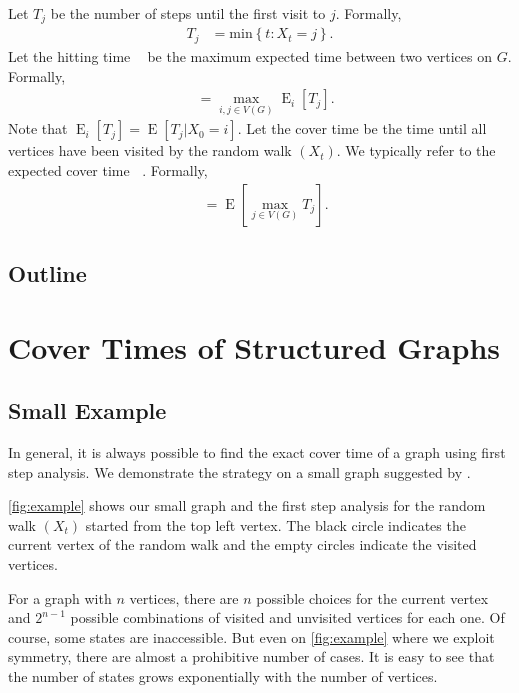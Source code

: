 \documentclass[12pt]{article}
\theoremstyle{definition}
\DeclareMathOperator{\E}{\mathrm{E}}		%
\DeclareMathOperator{\cov}{t_\textrm{cov}}  %
\DeclareMathOperator{\hit}{t_{\textrm{hit}}}%
\begin{document}
Let $T_{j}$ be the number of steps until the first visit to $j$.
Formally,
\begin{align}
T_{j} &= \textrm{min} \left\{t : X_t = j \right\}. \nonumber
\end{align}
Let the hitting time $\hit$ be the maximum expected time between two vertices on $G$.
Formally, 
\begin{align}
\hit &= \max_{i,j \in V(G)} \E_i[T_j]. \nonumber
\end{align}
Note that $\E_i[T_j] = \E[T_j | X_0 = i]$.
Let the cover time be the time until all vertices have been
visited by the random walk $(X_t)$.
We typically refer to the expected cover time $\cov$.
Formally,
\begin{align}
\cov &= \E [ \max_{j \in V(G)} T_j ]. \nonumber
\end{align}

\subsection{Outline}


\section{Cover Times of Structured Graphs}

\subsection{Small Example}
In general, it is always possible to find the exact cover time
of a graph using first step analysis.
We demonstrate the strategy on a small graph suggested by \cite{BH94}.

\cref{fig:example} shows our small graph and the first step analysis
for the random walk $(X_t)$ started from the top left vertex.
The black circle indicates the current vertex of the random walk
and the empty circles indicate the visited vertices.

For a graph with $n$ vertices, there are $n$ possible choices for the current
vertex and $2^{n-1}$ possible combinations of visited and unvisited vertices
for each one.
Of course, some states are inaccessible.
But even on \cref{fig:example} where we exploit symmetry,
there are almost a prohibitive number of cases.
It is easy to see that the number of states
grows exponentially with the number of vertices.
\end{document}
